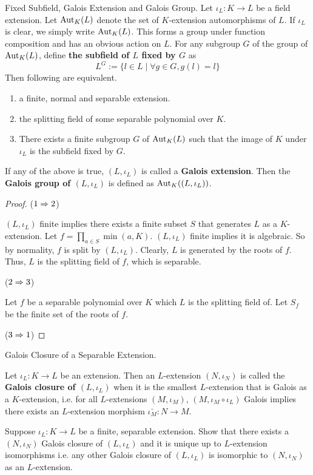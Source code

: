 \documentclass[../book.tex]{subfiles}
\begin{document}
\begin{dfn} Fixed Subfield, Galois Extension and Galois Group.
    Let $\iota_L : K \to L$ be a field extension.
    Let $\text{Aut}_{K}(L)$ denote the set of $K$-extension automorphisms of $L$.
    If $\iota_L$ is clear, we simply write $\text{Aut}_{K}(L)$. 
    This forms a group under function composition and has an obvious action on $L$. 
    For any subgroup $G$ of the group of $\text{Aut}_{K}(L)$, 
    define \textbf{the subfield of $L$ fixed by $G$} as
    \[ L^G := \{l \in L \mid \forall g \in G, g(l)=l\} \]
    Then following are equivalent.
    \begin{enumerate}
        \item a finite, normal and separable extension.
        \item the splitting field of some separable polynomial over $K$. 
        \item There exists a finite subgroup $G$ of $\text{Aut}_{K}(L)$ such that
        the image of $K$ under $\iota_L$ is the subfield fixed by $G$. 
    \end{enumerate} 
    If any of the above is true, $(L,\iota_L)$ is called 
    a \textbf{Galois extension}.
    Then the \textbf{Galois group of $(L,\iota_L)$} is defined as 
    $\text{Aut}_{K}((L,\iota_L))$.
\end{dfn}
\begin{proof}
    ($1\Rightarrow 2$)
        
        $(L,\iota_L)$ finite implies there exists a finite subset $S$
        that generates $L$ as a $K$-extension. 
        Let $f = \prod_{a\in S} \min(a,K)$. 
        $(L,\iota_L)$ finite implies it is algebraic. 
        So by normality, $f$ is split by $(L,\iota_L)$.
        Clearly, $L$ is generated by the roots of $f$.
        Thus, $L$ is the splitting field of $f$, which is separable. 
        
    ($2\Rightarrow 3$)
        
        Let $f$ be a separable polynomial over $K$ 
        which $L$ is the splitting field of.
        Let $S_f$ be the finite set of the roots of $f$. 
        
        
    ($3\Rightarrow 1$)
\end{proof}

\begin{ex} Galois Closure of a Separable Extension.
    
    Let $\iota_L : K \to L$ be an extension.
    Then an $L$-extension $(N,\iota_N)$ is called 
    the \textbf{Galois closure of $(L,\iota_L)$} 
    when it is the smallest $L$-extension that is Galois as a $K$-extension,
    i.e. for all $L$-extensions $(M,\iota_M)$,
    $(M,\iota_M\circ\iota_L)$ Galois implies
    there exists an $L$-extension morphism $\bar{\iota_M} : N \to M$. 
    
    Suppose $\iota_L : K \to L$ be a finite, separable extension. 
    Show that there exists a $(N,\iota_N)$ Galois closure of $(L,\iota_L)$
    and it is unique up to $L$-extension isomorphisms i.e.
    any other Galois closure of $(L,\iota_L)$ is isomorphic to $(N,\iota_N)$
    as an $L$-extension. 
    
\end{ex}
\end{document}
